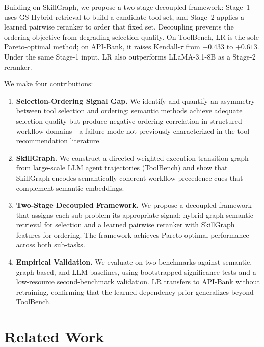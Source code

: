 \documentclass[lettersize,journal]{IEEEtran}
\begin{document}
Building on SkillGraph, we propose a two-stage decoupled framework: Stage~1 uses GS-Hybrid retrieval to build a candidate tool set, and Stage~2 applies a learned pairwise reranker to order that fixed set.
Decoupling prevents the ordering objective from degrading selection quality.
On ToolBench, LR is the sole Pareto-optimal method; on API-Bank, it raises Kendall-$\tau$ from $-0.433$ to $+0.613$.
Under the same Stage-1 input, LR also outperforms LLaMA-3.1-8B as a Stage-2 reranker.

We make four contributions:
\begin{enumerate}

\item \textbf{Selection-Ordering Signal Gap.}
We identify and quantify an asymmetry between tool selection and ordering: semantic methods achieve adequate selection quality but produce negative ordering correlation in structured workflow domains---a failure mode not previously characterized in the tool recommendation literature.

\item \textbf{SkillGraph.}
We construct a directed weighted execution-transition graph from large-scale LLM agent trajectories (ToolBench) and show that SkillGraph encodes semantically coherent workflow-precedence cues that complement semantic embeddings.

\item \textbf{Two-Stage Decoupled Framework.}
We propose a decoupled framework that assigns each sub-problem its appropriate signal: hybrid graph-semantic retrieval for selection and a learned pairwise reranker with SkillGraph features for ordering. The framework achieves Pareto-optimal performance across both sub-tasks.

\item \textbf{Empirical Validation.}
We evaluate on two benchmarks against semantic, graph-based, and LLM baselines, using bootstrapped significance tests and a low-resource second-benchmark validation. LR transfers to API-Bank without retraining, confirming that the learned dependency prior generalizes beyond ToolBench.

\end{enumerate}


\section{Related Work}
\label{sec:related}
\end{document}
